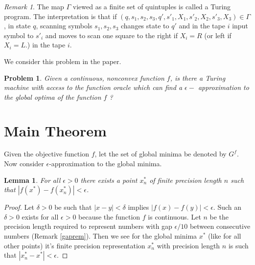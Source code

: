 \documentclass[a4paper,11pt]{article}
\newtheorem{lemma}[theorem]{Lemma}
\newtheorem{problem}[theorem]{Problem}
\theoremstyle{definition}
\theoremstyle{remark}
\newtheorem{remark}[theorem]{Remark}
\begin{document}
	\begin{remark}
		The map $\Gamma$ viewed as a finite set of quintuples is called a Turing program. The interpretation is that if $(q,s_1,s_2,s_3,q',s'_1,X_1,s'_2,X_2,s'_3,X_3) \in \Gamma$, in state $q$, scanning symbols $s_1, s_2, s_3$ changes state to $q'$ and in the tape $i$ input symbol to $s'_i$ and moves to scan one square to the right if $X_i=R$ (or left if $X_i=L$.) in the tape $i$.	
	\end{remark}
	
	We consider this problem in the paper.
	
	\begin{problem}
		Given a continuous, nonconvex function $f$, is there a Turing machine with access to the function oracle which can find a $\epsilon-$ approximation to the global optima of the function $f$ ?
	\end{problem}
	
	\section{Main Theorem}
	
	Given the objective function $f$, let the set of global minima be denoted by $G^f$. Now consider $\epsilon$-approximation to the global minima.  %
	
	\begin{lemma}\label{preclem}
		For all $\epsilon > 0$ there exists a point $x_n^*$ of finite precision length $n$ such that $|f(x^*)-f(x_n^*)| < \epsilon$. 
	\end{lemma}
	
	\begin{proof}
		Let $\delta > 0$ be such that $|x-y| < \delta$ implies $|f(x)-f(y)| < \epsilon$. Such an $\delta > 0$ exists for all $\epsilon > 0$ because the function $f$ is continuous. Let $n$ be the precision length required to represent numbers with gap $\epsilon/10$ between consecutive numbers (Remark \ref{gaprem}). Then we see for the global minima $x^*$ (like for all other points) it's finite precision representation $x_n^*$ with precision length $n$ is such that $|x_n^*-x^*|<\epsilon$. 
	\end{proof}
	
\end{document}
